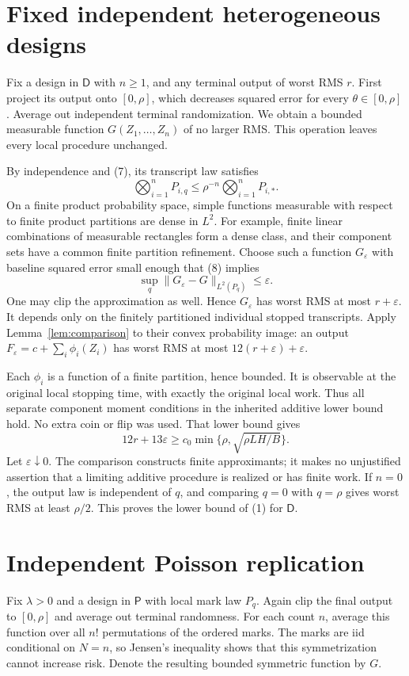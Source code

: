 \documentclass[11pt]{article}
\begin{document}
\section{Fixed independent heterogeneous designs}
Fix a design in $\mathsf D$ with $n\ge1$, and any terminal output of worst
RMS $r$. First project its output onto $[0,\rho]$, which decreases squared
error for every $\theta\in[0,\rho]$. Average out independent terminal
randomization. We obtain a bounded measurable function $G(Z_1,\ldots,Z_n)$
of no larger RMS. This operation leaves every local procedure unchanged.

By independence and (7), its transcript law satisfies
\[
        \bigotimes_{i=1}^nP_{i,q}
          \le \rho^{-n}\bigotimes_{i=1}^nP_{i,*}.            \tag{8}
\]
On a finite product probability space, simple functions measurable with
respect to finite product partitions are dense in $L^2$. For example,
finite linear combinations of measurable rectangles form a dense class,
and their component sets have a common finite partition refinement.
Choose such a function $G_\varepsilon$ with baseline squared error small
enough that (8) implies
\[
 \sup_q\|G_\varepsilon-G\|_{L^2(P_q)}\le\varepsilon.
\]
One may clip the approximation as well. Hence $G_\varepsilon$ has worst
RMS at most $r+\varepsilon$. It depends only on the finitely partitioned
individual stopped transcripts. Apply Lemma~\ref{lem:comparison} to their
convex probability image: an output
$F_\varepsilon=c+\sum_i\phi_i(Z_i)$ has worst RMS at most
$12(r+\varepsilon)+\varepsilon$.

Each $\phi_i$ is a function of a finite partition, hence bounded. It is
observable at the original local stopping time, with exactly the original
local work. Thus all separate component moment conditions in the inherited
additive lower bound hold. No extra coin or flip was used. That lower bound
gives
\[
 12r+13\varepsilon\ge
 c_0\min\{\rho,\sqrt{\rho LH/B}\}.
\]
Let $\varepsilon\downarrow0$. The comparison constructs finite approximants;
it makes no unjustified assertion that a limiting additive procedure is
realized or has finite work. If $n=0$, the output law is independent of $q$,
and comparing $q=0$ with $q=\rho$ gives worst RMS at least $\rho/2$.
This proves the lower bound of (1) for $\mathsf D$.

\section{Independent Poisson replication}
Fix $\lambda>0$ and a design in $\mathsf P$ with local mark law $P_q$.
Again clip the final output to $[0,\rho]$ and average out terminal randomness.
For each count $n$, average this function over all $n!$ permutations of the
ordered marks. The marks are iid conditional on $N=n$, so Jensen's inequality
shows that this symmetrization cannot increase risk. Denote the resulting
bounded symmetric function by $G$.
\end{document}
